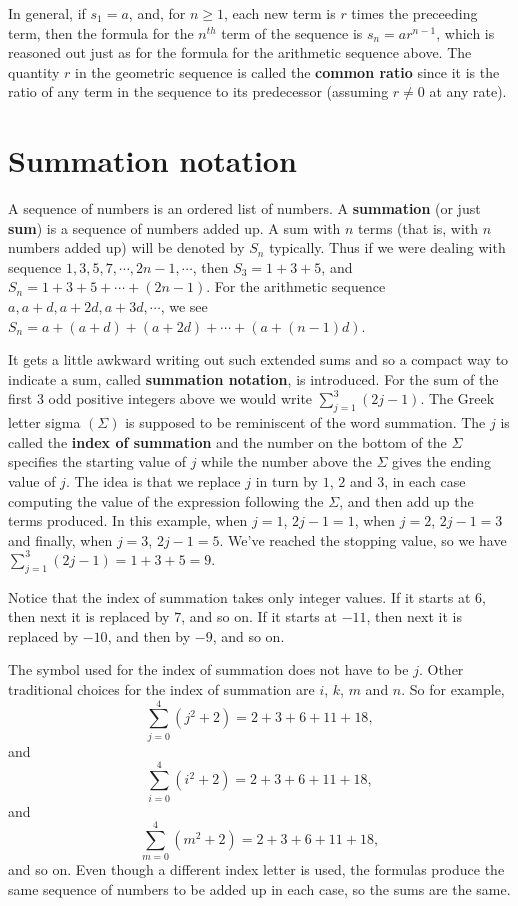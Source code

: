 In general, if $s_1=a$, and, for  
$n\geq1$, each new term is $r$ times the preceeding term, then the formula for the $n^{th}$ term of
the sequence is $s_n=ar^{n-1}$, which is reasoned out just as for
the formula for the arithmetic sequence above. The quantity $r$ in the
geometric sequence is called the {\bfseries common ratio} since it is the ratio
of any term in the sequence to its predecessor (assuming $r\not=0$ at any
rate).

\section{Summation notation}
   A sequence of numbers is an ordered list of numbers. A {\bf
summation} (or just {\bfseries sum}) is a sequence of numbers added up. A sum with
$n$ terms (that is, 
with $n$ numbers added up) will be denoted by $S_n$ typically. Thus if
we were dealing with sequence $1,3,5,7,\cdots,2n-1,\cdots$,
then $S_3 = 1+3+5$, and $S_n = 1+3+5+\cdots+(2n-1)$. For the arithmetic
sequence $a, a+d, a+2d, a+3d,\cdots$, we see $S_n = a +(a+d) +
(a+2d)+\cdots+(a+(n-1)d)$.


  It gets a little awkward writing out such extended sums and so a
compact way to indicate a sum, called {\bfseries summation notation},
is introduced. For the sum of the first $3$ odd positive integers above
we would write $\displaystyle{\sum_{j=1}^3(2j-1)}$. The Greek letter
sigma $(\Sigma)$ is supposed to be reminiscent of the word summation. The $j$ is
called 
the {\bfseries index of summation} and the number on the bottom of the
$\Sigma$
specifies the starting value of $j$ while the number above the $\Sigma$
gives the ending value of $j$. The idea is that we replace $j$ in
turn by $1$, $2$ and $3$, in each case computing the value of the
expression following the $\Sigma$, and then add up the terms produced.
In this example, when $j=1$, $2j-1=1$, when $j=2$, $2j-1=3$ and finally,
when $j=3$, $2j-1=5$. We've reached the stopping value, so we have
$\displaystyle{\sum_{j=1}^3(2j-1)}=1+3+5=9.$ 

Notice that the index of
summation takes only integer values. If it starts at $6$, then next it
is replaced by $7$, and so on. If it starts at $-11$, then next it is
replaced by $-10$, and then by $-9$, and so on.

The symbol used for the index of summation does not have to be $j$. Other
traditional choices for the index of summation are $i$, $k$, $m$ and $n$. So for
example, 
\[
\sum_{j=0}^4 (j^2+2) = 2+3+6+11+18,
\]
and
\[
\sum_{i=0}^4 (i^2+2) = 2+3+6+11+18,
\]
and
\[
\sum_{m=0}^4 (m^2+2) = 2+3+6+11+18,
\]
and so on. Even though a different index letter is used, the formulas produce the
same sequence of numbers to be added up in each case, so the sums are the
same.


